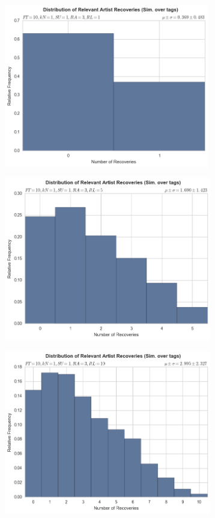 \documentclass[12pt]{article}
\begin{document}
\begin{figure}[h!]
\centering
  \begin{subfigure}
      \centering
    \includegraphics[height=2.8in]{tags,FT=10,kN=1,SU=1,RA=3,RL=1.png}
  \end{subfigure}
  \begin{subfigure}
      \centering
    \includegraphics[height=2.8in]{tags,FT=10,kN=1,SU=1,RA=3,RL=5.png}
  \end{subfigure}
  \begin{subfigure}
      \centering
    \includegraphics[height=2.8in]{tags,FT=10,kN=1,SU=1,RA=3,RL=10.png}

\end{subfigure}
\end{figure}
\end{document}
